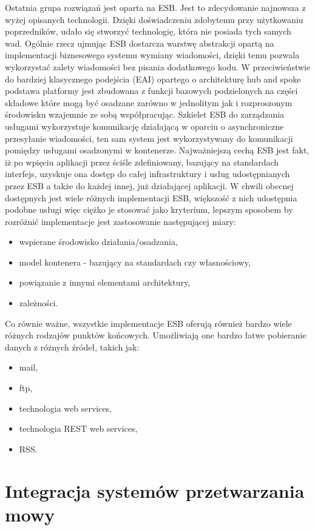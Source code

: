 Ostatnia grupa rozwiązań jest oparta na ESB. Jest to zdecydowanie najnowsza z wyżej opisanych technologii. Dzięki doświadczeniu zdobytemu przy użytkowaniu poprzedników, udało się stworzyć technologię, która nie posiada tych samych wad. Ogólnie rzecz ujmując ESB dostarcza warstwę abstrakcji opartą na implementacji biznesowego systemu wymiany wiadomości, dzięki temu pozwala wykorzystać zalety wiadomości bez pisania dodatkowego kodu. W przeciwieństwie do bardziej klasycznego podejścia (EAI) opartego o architekturę hub and spoke podstawa platformy jest zbudowana z funkcji bazowych podzielonych na części składowe które mogą być osadzane zarówno w jednolitym jak i rozproszonym środowisku wzajemnie ze sobą współpracując. Szkielet ESB do zarządzania usługami wykorzystuje komunikację działającą w oparciu o asynchroniczne przesyłanie wiadomości, ten sam system jest wykorzystywany do komunikacji pomiędzy usługami osadzonymi w kontenerze. Najważniejszą cechą ESB jest fakt, iż po wpięciu aplikacji przez ściśle zdefiniowany, bazujący na standardach interfejs, uzyskuje ona dostęp do całej infrastruktury i usług udostępnianych przez ESB a także do każdej innej, już działającej aplikacji. W chwili obecnej dostępnych jest wiele różnych implementacji ESB, większość z nich udostępnia podobne usługi więc ciężko je stosować jako kryterium, lepszym sposobem by rozróżnić implementacje jest zastosowanie następującej miary:
\begin{itemize}
	\item wspierane środowisko działania/osadzania,
	\item model kontenera - bazujący na standardach czy własnościowy,
	\item powiązanie z innymi elementami architektury,
	\item zależności.
\end{itemize}
Co równie ważne, wszystkie implementacje ESB oferują również bardzo wiele różnych rodzajów punktów końcowych. Umożliwiają one bardzo łatwe pobieranie danych z różnych źródeł, takich jak:
\begin{itemize}
	\item mail,
	\item ftp,
	\item technologia web services,
	\item technologia REST web services,
	\item RSS.
\end{itemize}

\section{Integracja systemów przetwarzania mowy}

